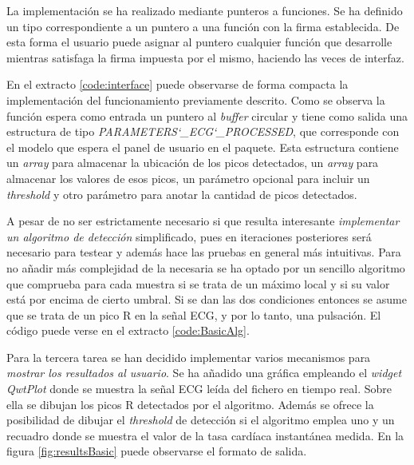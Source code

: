         La implementación se ha realizado mediante punteros a funciones. Se ha definido un tipo correspondiente a un puntero a una función con la firma establecida. De esta forma el usuario puede asignar al puntero cualquier función que desarrolle mientras satisfaga la firma impuesta por el mismo, haciendo las veces de interfaz.
        
        En el extracto \ref{code:interface} puede observarse de forma compacta la implementación del funcionamiento previamente descrito. Como se observa la función espera como entrada un puntero al \textit{buffer} circular y tiene como salida una estructura de tipo \textit{PARAMETERS\char`_ECG\char`_PROCESSED}, que corresponde con el modelo que espera el panel de usuario en el paquete. Esta estructura contiene un \textit{array} para almacenar la ubicación de los picos detectados, un \textit{array} para almacenar los valores de esos picos, un parámetro opcional para incluir un \textit{threshold} y otro parámetro para anotar la cantidad de picos detectados.
        
        
        A pesar de no ser estrictamente necesario si que resulta interesante \textit{implementar un algoritmo de detección} simplificado, pues en iteraciones posteriores será necesario para testear y además hace las pruebas en general más intuitivas. Para no añadir más complejidad de la necesaria se ha optado por un sencillo algoritmo que comprueba para cada muestra si se trata de un máximo local y si su valor está por encima de cierto umbral. Si se dan las dos condiciones entonces se asume que se trata de un pico R en la señal ECG, y por lo tanto, una pulsación. El código puede verse en el extracto \ref{code:BasicAlg}.
        
        

        Para la tercera tarea se han decidido implementar varios mecanismos para \textit{mostrar los resultados al usuario}. Se ha añadido una gráfica empleando el \textit{widget QwtPlot} donde se muestra la señal ECG leída del fichero en tiempo real. Sobre ella se dibujan los picos R detectados por el algoritmo. Además se ofrece la posibilidad de dibujar el \textit{threshold} de detección si el algoritmo emplea uno y un recuadro donde se muestra el valor de la tasa cardíaca instantánea medida. En la figura \ref{fig:resultsBasic} puede observarse el formato de salida.


